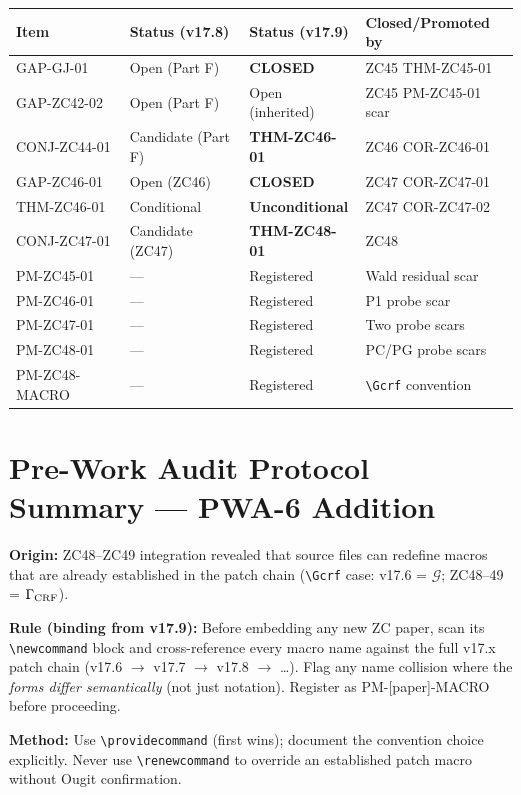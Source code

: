 \documentclass[12pt, a4paper]{article}
\begin{document}
\begin{longtable}{@{}lp{3cm}p{3.5cm}p{4cm}@{}}
\toprule
\textbf{Item} & \textbf{Status (v17.8)} & \textbf{Status (v17.9)}
  & \textbf{Closed/Promoted by} \\
\midrule
\endhead
GAP-GJ-01 & Open (Part F) & \textcolor{crfgreen}{\textbf{CLOSED}}
  & ZC45 THM-ZC45-01 \\
GAP-ZC42-02 & Open (Part F) & Open (inherited)
  & ZC45 PM-ZC45-01 scar \\
CONJ-ZC44-01 & Candidate (Part F) & \textcolor{crfgreen}{\textbf{THM-ZC46-01}}
  & ZC46 COR-ZC46-01 \\
GAP-ZC46-01 & Open (ZC46) & \textcolor{crfgreen}{\textbf{CLOSED}}
  & ZC47 COR-ZC47-01 \\
THM-ZC46-01 & Conditional & \textcolor{crfgreen}{\textbf{Unconditional}}
  & ZC47 COR-ZC47-02 \\
CONJ-ZC47-01 & Candidate (ZC47) & \textcolor{crfgreen}{\textbf{THM-ZC48-01}}
  & ZC48 \\
\midrule
PM-ZC45-01 & --- & \textcolor{loopred}{Registered}
  & Wald residual scar \\
PM-ZC46-01 & --- & \textcolor{loopred}{Registered}
  & P1 probe scar \\
PM-ZC47-01 & --- & \textcolor{loopred}{Registered}
  & Two probe scars \\
PM-ZC48-01 & --- & \textcolor{loopred}{Registered}
  & PC/PG probe scars \\
PM-ZC48-MACRO & --- & \textcolor{loopred}{Registered}
  & \texttt{\textbackslash Gcrf} convention \\
\bottomrule
\end{longtable}

\section{Pre-Work Audit Protocol Summary --- PWA-6 Addition}
\label{sec:pwa6}

\begin{keybox}[title={PWA-6: Macro Convention Cross-Check (v17.9 scar)}]
\textbf{Origin:} ZC48--ZC49 integration revealed that source files can
redefine macros that are already established in the patch chain
(\texttt{\textbackslash Gcrf} case: v17.6 = $\mathcal{G}$;
ZC48--49 = $\Gamma_{\rm CRF}$).

\textbf{Rule (binding from v17.9):}
Before embedding any new ZC paper, scan its
\texttt{\textbackslash newcommand} block and cross-reference every
macro name against the full v17.x patch chain
(v17.6 $\to$ v17.7 $\to$ v17.8 $\to$ \ldots). Flag any name collision
where the \emph{forms differ semantically} (not just notation).
Register as PM-[paper]-MACRO before proceeding.

\textbf{Method:} Use \texttt{\textbackslash providecommand} (first wins);
document the convention choice explicitly. Never use
\texttt{\textbackslash renewcommand} to override an established patch
macro without Ougit confirmation.
\end{keybox}
\end{document}

